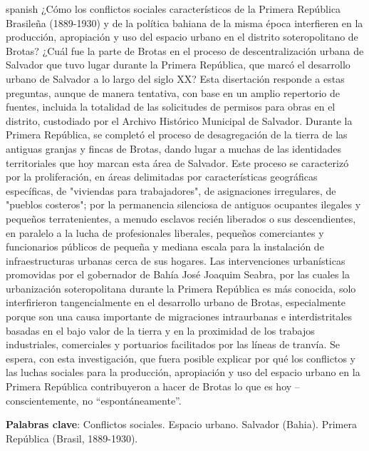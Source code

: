 \begin{resumo}[Resumen]
 \begin{otherlanguage*}{spanish}
¿Cómo los conflictos sociales característicos de la Primera República Brasileña (1889-1930) y de la política bahiana de la misma época interfieren en la producción, apropiación y uso del espacio urbano en el distrito soteropolitano de Brotas? ¿Cuál fue la parte de Brotas en el proceso de descentralización urbana de Salvador que tuvo lugar durante la Primera República, que marcó el desarrollo urbano de Salvador a lo largo del siglo XX? Esta disertación responde a estas preguntas, aunque de manera tentativa, con base en un amplio repertorio de fuentes, incluida la totalidad de las solicitudes de permisos para obras en el distrito, custodiado por el Archivo Histórico Municipal de Salvador. Durante la Primera República, se completó el proceso de desagregación de la tierra de las antiguas granjas y fincas de Brotas, dando lugar a muchas de las identidades territoriales que hoy marcan esta área de Salvador. Este proceso se caracterizó por la proliferación, en áreas delimitadas por características geográficas específicas, de "viviendas para trabajadores", de asignaciones irregulares, de "pueblos costeros"; por la permanencia silenciosa de antiguos ocupantes ilegales y pequeños terratenientes, a menudo esclavos recién liberados o sus descendientes, en paralelo a la lucha de profesionales liberales, pequeños comerciantes y funcionarios públicos de pequeña y mediana escala para la instalación de infraestructuras urbanas cerca de sus hogares. Las intervenciones urbanísticas promovidas por el gobernador de Bahía José Joaquim Seabra, por las cuales la urbanización soteropolitana durante la Primera República es más conocida, solo interfirieron tangencialmente en el desarrollo urbano de Brotas, especialmente porque son una causa importante de migraciones intraurbanas e interdistritales basadas en el bajo valor de la tierra y en la proximidad de los trabajos industriales, comerciales y portuarios facilitados por las líneas de tranvía. Se espera, con esta investigación, que fuera posible explicar por qué los conflictos y las luchas sociales para la producción, apropiación y uso del espacio urbano en la Primera República contribuyeron a hacer de Brotas lo que es hoy -- conscientemente, no ``espontáneamente''.
  
   \textbf{Palabras clave}: Conflictos sociales. Espacio urbano. Salvador (Bahia). Primera República (Brasil, 1889-1930).
 \end{otherlanguage*}
\end{resumo}
